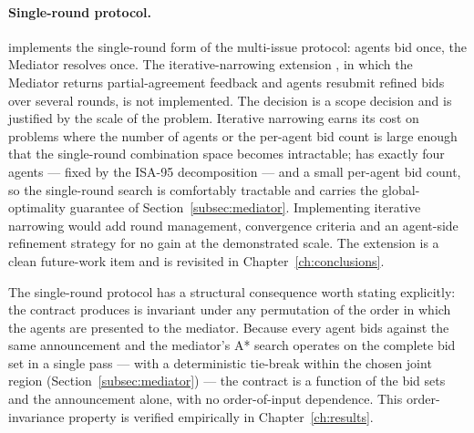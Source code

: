 \paragraph{Single-round protocol.}
\NEXUS{} implements the single-round form of the multi-issue protocol:
agents bid once, the Mediator resolves once. The iterative-narrowing
extension \cite{hattori2007narrowing}, in which the Mediator returns
partial-agreement feedback and agents resubmit refined bids over
several rounds, is not implemented. The decision is a scope decision
and is justified by the scale of the problem. Iterative narrowing earns
its cost on problems where the number of agents or the per-agent bid
count is large enough that the single-round combination space becomes
intractable; \NEXUS{} has exactly four agents --- fixed by the ISA-95
decomposition --- and a small per-agent bid count, so the single-round
search is comfortably tractable and carries the global-optimality
guarantee of Section~\ref{subsec:mediator}. Implementing iterative
narrowing would add round management, convergence criteria and an
agent-side refinement strategy for no gain at the demonstrated scale.
The extension is a clean future-work item and is revisited in
Chapter~\ref{ch:conclusions}.

The single-round protocol has a structural consequence worth stating
explicitly: the contract \NEXUS{} produces is invariant under any
permutation of the order in which the agents are presented to the
mediator. Because every agent bids against the same announcement and
the mediator's A* search operates on the complete bid set in a single
pass --- with a deterministic tie-break within the chosen joint region
(Section~\ref{subsec:mediator}) --- the contract is a function of the
bid sets and the announcement alone, with no order-of-input
dependence. This order-invariance property is verified empirically in
Chapter~\ref{ch:results}.

